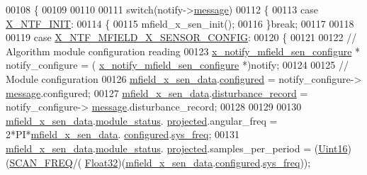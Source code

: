 \begin{DoxyCode}
00108 \{
00109 
00110 
00111     \textcolor{keywordflow}{switch}(notify->\hyperlink{a00036_adf9665938515a20c283eea2c978cf80d}{message})
00112     \{
00113         \textcolor{keywordflow}{case} \hyperlink{a00036_a620b808f2d7b8d2a03c4d026a4c5423c}{X\_NTF\_INIT}:
00114         \{
00115             mfield\_x\_sen\_init();
00116         \}\textcolor{keywordflow}{break};
00117 
00118 
00119         \textcolor{keywordflow}{case} \hyperlink{a00019_aa16cf9dd51c7cbef48581b7862153ced}{X\_NTF\_MFIELD\_X\_SENSOR\_CONFIG}:
00120         \{
00121 
00122               \textcolor{comment}{// Algorithm module configuration reading}
00123               \hyperlink{a00019_d2/d5e/a00860}{x\_notify\_mfield\_sen\_configure} * notify\_configure = (
      \hyperlink{a00019_d2/d5e/a00860}{x\_notify\_mfield\_sen\_configure} *)notify;
00124 
00125               \textcolor{comment}{// Module configuration}
00126               \hyperlink{a00050_af8c531b1ba5fea148fb9111e06058f92}{mfield\_x\_sen\_data}.\hyperlink{a00025_a94b2d1f6ea4ab334c74d24984dd27843}{configured} = notify\_configure->
      \hyperlink{a00019_ae926905663cb8ca01f1bc2d670e428f5}{message}.configured;
00127               \hyperlink{a00050_af8c531b1ba5fea148fb9111e06058f92}{mfield\_x\_sen\_data}.\hyperlink{a00025_ac9b38e2c1d3f1013a88d33506c754152}{disturbance\_record} = notify\_configure->
      \hyperlink{a00019_ae926905663cb8ca01f1bc2d670e428f5}{message}.disturbance\_record;
00128 
00129 
00130               \hyperlink{a00050_af8c531b1ba5fea148fb9111e06058f92}{mfield\_x\_sen\_data}.\hyperlink{a00025_adfab5a5d8b45a93dfb13edb24e2b80e3}{module\_status}.
      \hyperlink{a00019_af2267fb093fb5dcaa006a570a6da3b6b}{projected}.angular\_freq             = 2*PI*\hyperlink{a00050_af8c531b1ba5fea148fb9111e06058f92}{mfield\_x\_sen\_data}.
      \hyperlink{a00025_a94b2d1f6ea4ab334c74d24984dd27843}{configured}.\hyperlink{a00021_aa57be45aa1320405a885474010159c9e}{sys\_freq};
00131               \hyperlink{a00050_af8c531b1ba5fea148fb9111e06058f92}{mfield\_x\_sen\_data}.\hyperlink{a00025_adfab5a5d8b45a93dfb13edb24e2b80e3}{module\_status}.
      \hyperlink{a00019_af2267fb093fb5dcaa006a570a6da3b6b}{projected}.samples\_per\_period       = (\hyperlink{a00072_a59a9f6be4562c327cbfb4f7e8e18f08b}{Uint16})(\hyperlink{a00021_a8127170b687c1f67a968886c128e76e4}{SCAN\_FREQ}/(
      \hyperlink{a00072_a87d38f886e617ced2698fc55afa07637}{Float32})(\hyperlink{a00050_af8c531b1ba5fea148fb9111e06058f92}{mfield\_x\_sen\_data}.\hyperlink{a00025_a94b2d1f6ea4ab334c74d24984dd27843}{configured}.\hyperlink{a00021_aa57be45aa1320405a885474010159c9e}{sys\_freq}));

\end{DoxyCode}

